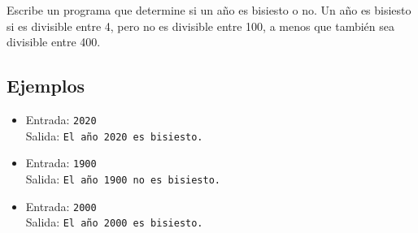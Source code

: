 Escribe un programa que determine si un año es bisiesto o no. Un año es bisiesto si es divisible entre 4, pero no es divisible entre 100, a menos que también sea divisible entre 400.
\subsection*{Ejemplos}
\begin{itemize}
    \item Entrada: \texttt{2020}\\
          Salida: \texttt{El año 2020 es bisiesto.}
    \item Entrada: \texttt{1900}\\
          Salida: \texttt{El año 1900 no es bisiesto.}
    \item Entrada: \texttt{2000}\\
          Salida: \texttt{El año 2000 es bisiesto.}
\end{itemize}
